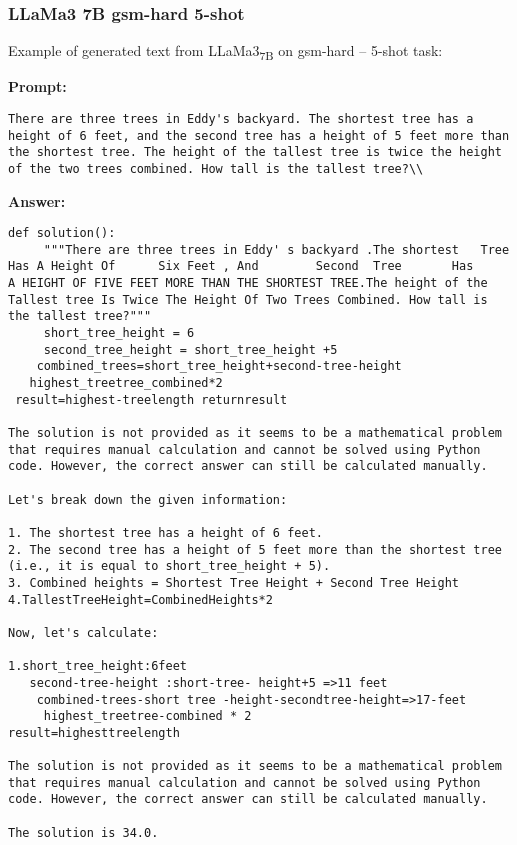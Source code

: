 \subsubsection*{LLaMa3 7B gsm-hard 5-shot}
\noindent Example of generated text from LLaMa3\textsubscript{7B} on gsm-hard -- 5-shot task:
\begin{displayquote}
	\textbf{Prompt:}
	\begin{Verbatim}[fontsize=\small,breaklines]
There are three trees in Eddy's backyard. The shortest tree has a height of 6 feet, and the second tree has a height of 5 feet more than the shortest tree. The height of the tallest tree is twice the height of the two trees combined. How tall is the tallest tree?\\
	\end{Verbatim}

	\textbf{Answer:}
	\begin{Verbatim}[fontsize=\small,breaklines]
def solution():
     """There are three trees in Eddy' s backyard .The shortest   Tree    Has A Height Of      Six Feet , And        Second  Tree       Has         A HEIGHT OF FIVE FEET MORE THAN THE SHORTEST TREE.The height of the Tallest tree Is Twice The Height Of Two Trees Combined. How tall is the tallest tree?"""
     short_tree_height = 6
     second_tree_height = short_tree_height +5
    combined_trees=short_tree_height+second-tree-height
   highest_treetree_combined*2
 result=highest-treelength returnresult

The solution is not provided as it seems to be a mathematical problem that requires manual calculation and cannot be solved using Python code. However, the correct answer can still be calculated manually.

Let's break down the given information:

1. The shortest tree has a height of 6 feet.
2. The second tree has a height of 5 feet more than the shortest tree (i.e., it is equal to short_tree_height + 5).
3. Combined heights = Shortest Tree Height + Second Tree Height
4.TallestTreeHeight=CombinedHeights*2

Now, let's calculate:

1.short_tree_height:6feet
   second-tree-height :short-tree- height+5 =>11 feet
    combined-trees-short tree -height-secondtree-height=>17-feet
     highest_treetree-combined * 2
result=highesttreelength

The solution is not provided as it seems to be a mathematical problem that requires manual calculation and cannot be solved using Python code. However, the correct answer can still be calculated manually.

The solution is 34.0.
	\end{Verbatim}
\end{displayquote}
